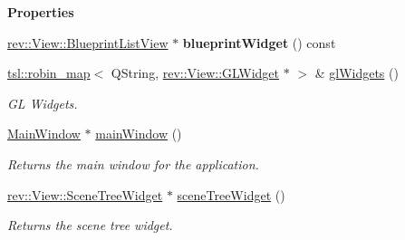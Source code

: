 \begin{Indent}\textbf{ Properties}\par
\begin{DoxyCompactItemize}
\item 
\mbox{\label{classrev_1_1_view_1_1_widget_manager_a3ff73f896bd10025722ef197748cfb74}} 
\mbox{\hyperlink{classrev_1_1_view_1_1_blueprint_list_view}{rev\+::\+View\+::\+Blueprint\+List\+View}} $\ast$ {\bfseries blueprint\+Widget} () const
\item 
\mbox{\label{classrev_1_1_view_1_1_widget_manager_a8ced6a24cb280837c3d15b349fe44eb9}} 
\mbox{\hyperlink{classtsl_1_1robin__map}{tsl\+::robin\+\_\+map}}$<$ Q\+String, \mbox{\hyperlink{classrev_1_1_view_1_1_g_l_widget}{rev\+::\+View\+::\+G\+L\+Widget}} $\ast$ $>$ \& \mbox{\hyperlink{classrev_1_1_view_1_1_widget_manager_a8ced6a24cb280837c3d15b349fe44eb9}{gl\+Widgets}} ()
\begin{DoxyCompactList}\small\item\em GL Widgets. \end{DoxyCompactList}\item 
\mbox{\label{classrev_1_1_view_1_1_widget_manager_a175bfd15d407ccf2960cfadfc2799228}} 
\mbox{\hyperlink{classrev_1_1_main_window}{Main\+Window}} $\ast$ \mbox{\hyperlink{classrev_1_1_view_1_1_widget_manager_a175bfd15d407ccf2960cfadfc2799228}{main\+Window}} ()
\begin{DoxyCompactList}\small\item\em Returns the main window for the application. \end{DoxyCompactList}\item 
\mbox{\label{classrev_1_1_view_1_1_widget_manager_a57beb574e4c5e0aad5bb66857bfae317}} 
\mbox{\hyperlink{classrev_1_1_view_1_1_scene_tree_widget}{rev\+::\+View\+::\+Scene\+Tree\+Widget}} $\ast$ \mbox{\hyperlink{classrev_1_1_view_1_1_widget_manager_a57beb574e4c5e0aad5bb66857bfae317}{scene\+Tree\+Widget}} ()
\begin{DoxyCompactList}\small\item\em Returns the scene tree widget. \end{DoxyCompactList}\item 
\mbox{\label{classrev_1_1_view_1_1_widget_manager_ae3e208284627374c1dbeac0d52f8a7fd}} 

\end{DoxyCompactItemize}
\end{Indent}
